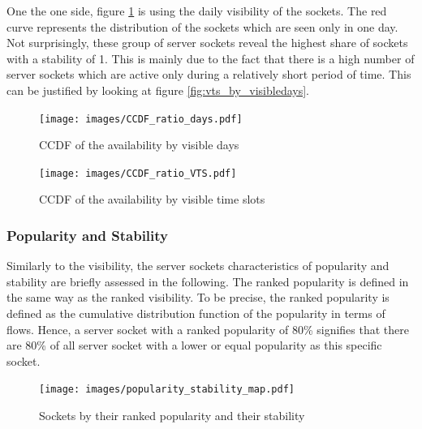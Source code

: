 One the one side, figure \ref{fig:ccdf_ratio_days} is using the daily visibility 
of the sockets. The red curve represents the distribution of the sockets which 
are seen only in one day. Not surprisingly, these group of \glspl{server socket} 
reveal the highest share of sockets with a stability of 1. This is mainly due to 
the fact that there is a high number of \glspl{server socket} which are active 
only during a relatively short period of time. This can be justified by looking 
at figure \ref{fig:vts_by_visibledays}.


\begin{landscape}
\begin{figure}
	[p] \centering 
	\texttt{[image: images/CCDF\_ratio\_days.pdf]}
	\caption{CCDF of the availability by visible days} 
	\label{fig:ccdf_ratio_days} 
\end{figure}
\end{landscape}

\begin{landscape}
\begin{figure}
	[p] \centering 
	\texttt{[image: images/CCDF\_ratio\_VTS.pdf]}
	\caption{CCDF of the availability by visible time slots} 
	\label{fig:ccdf_ratio_vts} 
\end{figure}
\end{landscape}

\subsubsection{Popularity and Stability}
Similarly to the visibility, the \glspl{server socket} characteristics of popularity 
and stability are briefly assessed in the following. The ranked popularity is 
defined in the same way as the ranked visibility. To be precise, the ranked 
popularity is defined as the cumulative distribution function of the popularity 
in terms of flows. Hence, a \gls{server socket} with a ranked popularity of 80\% 
signifies that there are 80\% of all \gls{server socket} with a lower or equal 
popularity as this specific socket.



\begin{figure}
	[ht] \centering 
	\texttt{[image: images/popularity\_stability\_map.pdf]}
	\caption{Sockets by their ranked popularity and their stability} 
	\label{fig:rankedPopularity} 
\end{figure}


